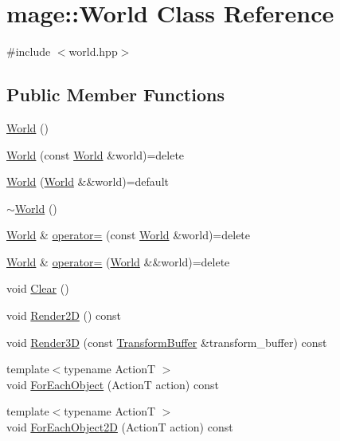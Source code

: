 \hypertarget{classmage_1_1_world}{}\section{mage\+:\+:World Class Reference}
\label{classmage_1_1_world}


{\ttfamily \#include $<$world.\+hpp$>$}

\subsection*{Public Member Functions}
\begin{DoxyCompactItemize}
\item 
\hyperlink{classmage_1_1_world_a4b3883a575dcfb8c1f542ecb5938ddc5}{World} ()
\item 
\hyperlink{classmage_1_1_world_a28e20e33499cd57282cefa5ab0fda041}{World} (const \hyperlink{classmage_1_1_world}{World} \&world)=delete
\item 
\hyperlink{classmage_1_1_world_a6170766c5b83465cfdbf847e67315d91}{World} (\hyperlink{classmage_1_1_world}{World} \&\&world)=default
\item 
\hyperlink{classmage_1_1_world_a8f594ba33a69c4142d599e548337bbcf}{$\sim$\+World} ()
\item 
\hyperlink{classmage_1_1_world}{World} \& \hyperlink{classmage_1_1_world_aa7074e3847c9fbe1466aa833f194eed0}{operator=} (const \hyperlink{classmage_1_1_world}{World} \&world)=delete
\item 
\hyperlink{classmage_1_1_world}{World} \& \hyperlink{classmage_1_1_world_a0440e945dfd0291174ce6dc33e5d8335}{operator=} (\hyperlink{classmage_1_1_world}{World} \&\&world)=delete
\item 
void \hyperlink{classmage_1_1_world_a5562299c0c78c7f6cb63b2de77c1fe79}{Clear} ()
\item 
void \hyperlink{classmage_1_1_world_a49e7adf01a415aefc911d69c6fcee665}{Render2D} () const
\item 
void \hyperlink{classmage_1_1_world_a6d5a6fe97bf24c174d9c8f544be34d13}{Render3D} (const \hyperlink{structmage_1_1_transform_buffer}{Transform\+Buffer} \&transform\+\_\+buffer) const
\item 
{\footnotesize template$<$typename ActionT $>$ }\\void \hyperlink{classmage_1_1_world_a9bb9af95395546e334609473dda0854c}{For\+Each\+Object} (ActionT action) const
\item 
{\footnotesize template$<$typename ActionT $>$ }\\void \hyperlink{classmage_1_1_world_ae8293799bc02d12c7a48e248bcc3eb33}{For\+Each\+Object2D} (ActionT action) const

\end{DoxyCompactItemize}
